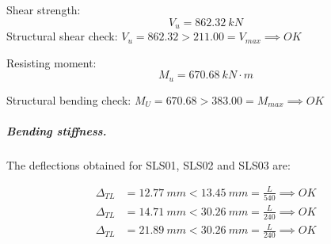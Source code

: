 \noindent Shear strength:
\begin{equation}
  V_u= 862.32\ kN 
\end{equation}
\noindent Structural shear check: $V_u = 862.32 > 211.00 = V_{max} \implies OK$

\noindent Resisting moment:
\begin{equation}
  M_u= 670.68\ kN\cdot m
\end{equation}

\noindent Structural bending check: $M_U = 670.68 > 383.00 = M_{max} \implies OK$

\subparagraph{Bending stiffness.}
The deflections obtained for SLS01, SLS02 and SLS03 are:

\begin{align}
  \Delta_{TL} &= 12.77\ mm < 13.45\ mm = \frac{L}{540} \implies OK\\
  \Delta_{TL} &= 14.71\ mm < 30.26\ mm = \frac{L}{240} \implies OK\\
  \Delta_{TL} &= 21.89\ mm < 30.26\ mm = \frac{L}{240} \implies OK
\end{align}
